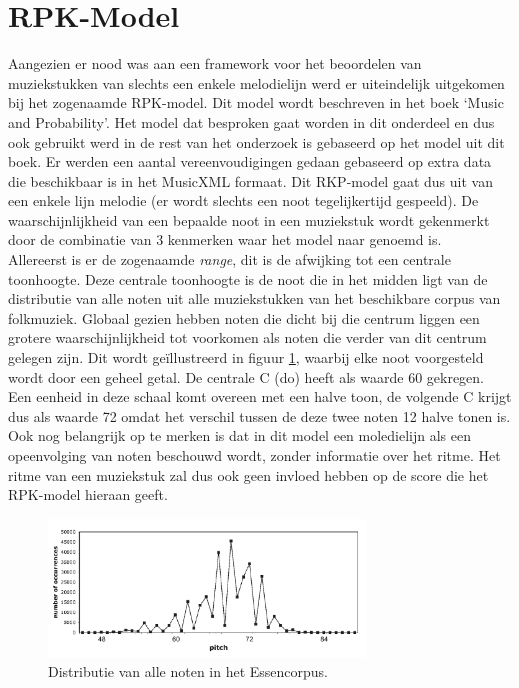 \section{RPK-Model}
\label{OBM:RPK}
Aangezien er nood was aan een framework voor het beoordelen van muziekstukken van slechts een enkele melodielijn werd er uiteindelijk uitgekomen bij het zogenaamde RPK-model. Dit model wordt beschreven in het boek `Music and Probability'\cite{book:musicAndProbability}. Het model dat besproken gaat worden in dit onderdeel en dus ook gebruikt werd in de rest van het onderzoek is gebaseerd op het model uit dit boek. Er werden een aantal vereenvoudigingen gedaan gebaseerd op extra data die beschikbaar is in het MusicXML formaat. Dit RKP-model gaat dus uit van een enkele lijn melodie (er wordt slechts een noot tegelijkertijd gespeeld). De waarschijnlijkheid van een bepaalde noot in een muziekstuk wordt gekenmerkt door de combinatie van 3 kenmerken waar het model naar genoemd is.\\
Allereerst is er de zogenaamde \textit{range}, dit is de afwijking tot een centrale toonhoogte. Deze centrale toonhoogte is de noot die in het midden ligt van de distributie van alle noten uit alle muziekstukken van het beschikbare corpus van folkmuziek. Globaal gezien hebben noten die dicht bij die centrum liggen een grotere waarschijnlijkheid tot voorkomen als noten die verder van dit centrum gelegen zijn. Dit wordt ge\"illustreerd in figuur \ref{figuur:range}, waarbij elke noot voorgesteld wordt door een geheel getal. De centrale C (do) heeft als waarde 60 gekregen. Een eenheid in deze schaal komt overeen met een halve toon, de volgende C krijgt dus als waarde 72 omdat het verschil tussen de deze twee noten 12 halve tonen is. Ook nog belangrijk op te merken is dat in dit model een moledielijn als een opeenvolging van noten beschouwd wordt, zonder informatie over het ritme. Het ritme van een muziekstuk zal dus ook geen invloed hebben op de score die het RPK-model hieraan geeft.\\ 

\begin{figure}[!ht]
  \centering
  \includegraphics[width=0.75\textwidth]{2_Objectieve_Beoordeling/range}
  \caption{Distributie van alle noten in het Essencorpus.}
  \label{figuur:range}
\end{figure}

